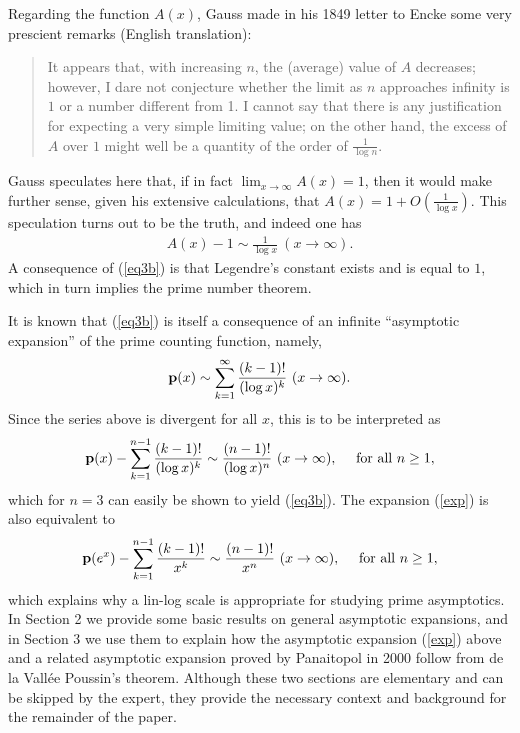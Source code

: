 \documentclass[12pt]{article}
\begin{document}
Regarding the function $A(x)$, Gauss made in his 1849 letter to Encke some very prescient remarks (English translation):
\begin{quote}
It appears that, with increasing $n$, the (average) value of $A$ decreases; however, I dare not conjecture whether the limit as $n$ approaches infinity is $1$ or a number different from 1.  I cannot say that there is any justification for expecting a very simple limiting value; on the other hand, the excess of $A$ over $1$ might well be a quantity of the order of $\frac{1}{\log n}$.
\end{quote}
Gauss speculates here that, if in fact $\lim_{x \to \infty} A(x) = 1$, then it would make further sense, given his extensive calculations, that $A(x) = 1+ O\left( \frac{1}{\log x}\right)$.
This speculation turns out to be the truth, and indeed one has
\begin{align}\label{eq3b}A(x) -1 \sim \frac{1}{\log x} \ (x \to \infty).
\end{align} 
A consequence of (\ref{eq3b}) is that Legendre's constant exists and is equal to $1$, which in turn implies the prime number theorem.


It is known that (\ref{eq3b}) is itself a  consequence of an infinite ``asymptotic expansion'' of the prime counting function, namely,
\begin{align}\label{exp}
{\mathbf p}(x) \sim \sum_{k = 1}^\infty {\frac {(k-1)!}{(\log x)^{k}}} \ (x \to \infty).
\end{align}  
Since the series above is divergent for all $x$, this is to be interpreted as 
\begin{align*}
{\mathbf p}(x) - \sum_{k = 1}^{n-1} {\frac {(k-1)!}{(\log x)^{k}}} \sim \frac{(n-1)!}{(\log x)^n} \ (x \to \infty), \quad \mbox{ for all } n \geq 1,
\end{align*}
which for $n = 3$ can easily be shown to yield  (\ref{eq3b}).  The expansion (\ref{exp}) is also equivalent to
\begin{align*}
{\mathbf p}(e^x) - \sum_{k = 1}^{n-1} {\frac {(k-1)!}{x^{k}}} \sim \frac{(n-1)!}{x^n} \ (x \to \infty), \quad \mbox{ for all } n \geq 1,
\end{align*}
which explains why a lin-log scale is appropriate for studying prime asymptotics.  In Section 2 we provide some basic results on general asymptotic expansions, and in Section 3 we use them to explain how the asymptotic expansion (\ref{exp}) above and a related asymptotic expansion proved by Panaitopol in 2000 \cite{pan} follow from  de la Vall\'ee Poussin's theorem.   Although these two sections are elementary and can be skipped by the expert, they provide the necessary context and background for the remainder of the paper.
\end{document}
